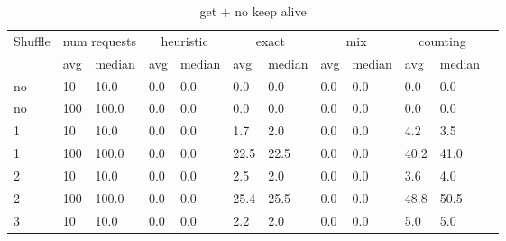 \documentclass[12pt,a4paper]{report}
\begin{document}
\begin{table}[h]
	\centering
	\caption{get + no keep alive}
	\label{tab:get_nka}
	\begin{tabular}{|l|l|l|l|l|l|l|l|l|l|l|l|}
		\hline
		\multirow{2}{*}{Shuffle} & \multicolumn{2}{|c|}{num requests} & \multicolumn{2}{|c|}{heuristic} & \multicolumn{2}{|c|}{exact} & \multicolumn{2}{|c|}{mix} & \multicolumn{2}{|c|}{counting}                                         \\ \cline{2-11}
		                         & avg                                & median                          & avg                         & median                    & avg                            & median & avg & median & avg  & median \\ \hline
		no                       & 10                                 & 10.0                            & 0.0                         & 0.0                       & 0.0                            & 0.0    & 0.0 & 0.0    & 0.0  & 0.0    \\ \hline
		no                       & 100                                & 100.0                           & 0.0                         & 0.0                       & 0.0                            & 0.0    & 0.0 & 0.0    & 0.0  & 0.0    \\ \hline
		1                        & 10                                 & 10.0                            & 0.0                         & 0.0                       & 1.7                            & 2.0    & 0.0 & 0.0    & 4.2  & 3.5    \\ \hline
		1                        & 100                                & 100.0                           & 0.0                         & 0.0                       & 22.5                           & 22.5   & 0.0 & 0.0    & 40.2 & 41.0   \\ \hline
		2                        & 10                                 & 10.0                            & 0.0                         & 0.0                       & 2.5                            & 2.0    & 0.0 & 0.0    & 3.6  & 4.0    \\ \hline
		2                        & 100                                & 100.0                           & 0.0                         & 0.0                       & 25.4                           & 25.5   & 0.0 & 0.0    & 48.8 & 50.5   \\ \hline
		3                        & 10                                 & 10.0                            & 0.0                         & 0.0                       & 2.2                            & 2.0    & 0.0 & 0.0    & 5.0  & 5.0    \\ \hline

\end{tabular}
\end{table}
\end{document}
